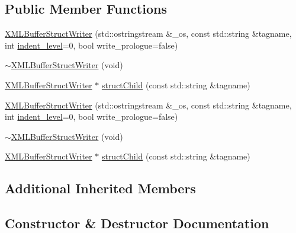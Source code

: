 \subsection*{Public Member Functions}
\begin{DoxyCompactItemize}
\item 
\mbox{\hyperlink{classXMLStructWriterAPI_1_1XMLBufferStructWriter_adc348003ff0e12b5a820972cbc51a376}{X\+M\+L\+Buffer\+Struct\+Writer}} (std\+::ostringstream \&\+\_\+os, const std\+::string \&tagname, int \mbox{\hyperlink{classXMLStructWriterAPI_1_1XMLStructWriterBase_ac592a077855a1377b390f4abff506e38}{indent\+\_\+level}}=0, bool write\+\_\+prologue=false)
\item 
\mbox{\hyperlink{classXMLStructWriterAPI_1_1XMLBufferStructWriter_a00bf336d98d848ad4552ee46ea32dd78}{$\sim$\+X\+M\+L\+Buffer\+Struct\+Writer}} (void)
\item 
\mbox{\hyperlink{classXMLStructWriterAPI_1_1XMLBufferStructWriter}{X\+M\+L\+Buffer\+Struct\+Writer}} $\ast$ \mbox{\hyperlink{classXMLStructWriterAPI_1_1XMLBufferStructWriter_a1c5689221a56527dfd86ac071db3a534}{struct\+Child}} (const std\+::string \&tagname)
\item 
\mbox{\hyperlink{classXMLStructWriterAPI_1_1XMLBufferStructWriter_adc348003ff0e12b5a820972cbc51a376}{X\+M\+L\+Buffer\+Struct\+Writer}} (std\+::ostringstream \&\+\_\+os, const std\+::string \&tagname, int \mbox{\hyperlink{classXMLStructWriterAPI_1_1XMLStructWriterBase_ac592a077855a1377b390f4abff506e38}{indent\+\_\+level}}=0, bool write\+\_\+prologue=false)
\item 
\mbox{\hyperlink{classXMLStructWriterAPI_1_1XMLBufferStructWriter_a00bf336d98d848ad4552ee46ea32dd78}{$\sim$\+X\+M\+L\+Buffer\+Struct\+Writer}} (void)
\item 
\mbox{\hyperlink{classXMLStructWriterAPI_1_1XMLBufferStructWriter}{X\+M\+L\+Buffer\+Struct\+Writer}} $\ast$ \mbox{\hyperlink{classXMLStructWriterAPI_1_1XMLBufferStructWriter_a1c5689221a56527dfd86ac071db3a534}{struct\+Child}} (const std\+::string \&tagname)
\end{DoxyCompactItemize}
\subsection*{Additional Inherited Members}


\subsection{Constructor \& Destructor Documentation}
\mbox{\label{classXMLStructWriterAPI_1_1XMLBufferStructWriter_adc348003ff0e12b5a820972cbc51a376}} 
